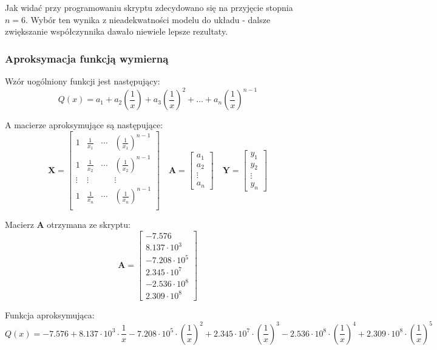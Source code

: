 \documentclass[a4paper, 12pt]{mwart}
\begin{document}
				Jak widać przy programowaniu skryptu zdecydowano się na przyjęcie stopnia $n=6$.
				Wybór ten wynika z nieadekwatności modelu do układu - dalsze zwiększanie współczynnika dawało
				niewiele lepsze rezultaty.

		\newpage
			\subsubsection{Aproksymacja funkcją wymierną}
				Wzór uogólniony funkcji jest następujący:
				$$Q(x) = a_1 + a_2 \left(\frac{1}{x}\right) + a_3 \left(\frac{1}{x}\right)^2 + \dots + a_n \left(\frac{1}{x}\right)^{n-1}$$

				A macierze aproksymujące są następujące:
				$$\textbf{X} = \begin{bmatrix}
					1     & \frac{1}{x_1} & \cdots & \left(\frac{1}{x_1}\right)^{n-1}\\
					1     & \frac{1}{x_2} & \cdots & \left(\frac{1}{x_2}\right)^{n-1}\\
					\vdots& \vdots        &        & \vdots\\
					1     & \frac{1}{x_n} & \cdots & \left(\frac{1}{x_n}\right)^{n-1}\\
				\end{bmatrix}
				\quad 
				\textbf{A} = \begin{bmatrix}
					a_1\\
					a_2\\
					\vdots\\
					a_n
				\end{bmatrix} \quad
				\textbf{Y} = \begin{bmatrix}
					y_1\\
					y_2\\
					\vdots\\
					y_n
				\end{bmatrix}$$

				Macierz $\textbf{A}$ otrzymana ze skryptu:
				$$\textbf{A} = \begin{bmatrix}
					-7.576\\
					8.137 \cdot 10^3\\
					-7.208 \cdot 10^5\\
					2.345 \cdot 10^7\\
					-2.536 \cdot 10^8\\
					2.309 \cdot 10^8
				\end{bmatrix}$$

				Funkcja aproksymująca:
				$$Q(x) = -7.576  + 8.137 \cdot 10^3 \cdot \frac{1}{x} -7.208 \cdot 10^5 \cdot
				\left(\frac{1}{x}\right)^2 + 2.345 \cdot 10^7 \cdot \left(\frac{1}{x}\right)^3
				-2.536 \cdot 10^8 \cdot \left(\frac{1}{x}\right)^4 + 2.309 \cdot 10^8 \cdot \left(
				\frac{1}{x}\right)^5$$
\end{document}

